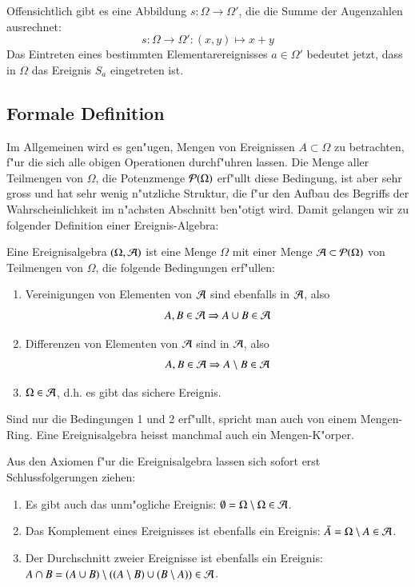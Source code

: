 Offensichtlich gibt es eine Abbildung $s\colon \Omega\to\Omega'$, die 
die Summe der Augenzahlen ausrechnet:
\[
s\colon\Omega\to\Omega':(x,y)\mapsto x+y
\]
Das Eintreten eines bestimmten Elementarereignisses $a \in\Omega'$
bedeutet jetzt, dass in $\Omega$ das Ereignis $S_a$ eingetreten
ist. 

\subsection{Formale Definition}
Im Allgemeinen wird es gen"ugen, Mengen von Ereignissen
$A\subset\Omega$ zu betrachten, f"ur die sich alle obigen
Operationen durchf"uhren lassen. Die Menge aller Teilmengen von
$\Omega$, die Potenzmenge ${\cal P}(\Omega)$ erf"ullt diese Bedingung,
ist aber sehr gross und hat sehr wenig n"utzliche Struktur, die
f"ur den Aufbau des Begriffs der Wahrscheinlichkeit im n"achsten
Abschnitt ben"otigt wird.  Damit gelangen wir zu folgender Definition
einer Ereignis-Algebra:

\begin{definition}
\label{def-ereignisalgebra}
Eine Ereignisalgebra $(\Omega,{\cal A})$ ist
eine Menge $\Omega$ mit einer Menge ${\cal A }\subset{\cal P}(\Omega)$
von Teilmengen von $\Omega$, die folgende Bedingungen erf"ullen:
\begin{enumerate}
\item Vereinigungen von Elementen von ${\cal A}$ sind ebenfalls in ${\cal A}$,
also
\[
A,B\in {\cal A}\Rightarrow A\cup B\in{\cal A}
\]
\item Differenzen von Elementen von ${\cal A}$ sind in ${\cal A}$, also
\[
A,B\in {\cal A}\Rightarrow A\setminus B\in{\cal A}
\]
\item $\Omega\in{\cal A}$, d.h. es gibt das sichere Ereignis.
\end{enumerate}
\end{definition}

Sind nur die Bedingungen 1 und 2 erf"ullt, spricht man auch von einem
Mengen-Ring. Eine Ereignisalgebra heisst manchmal auch ein Mengen-K"orper.

Aus den Axiomen f"ur die Ereignisalgebra lassen sich sofort erst
Schlussfolgerungen ziehen:
\begin{enumerate}
\item Es gibt auch das unm"ogliche Ereignis: $\emptyset = \Omega\setminus\Omega\in{\cal A}$.
\item Das Komplement eines Ereignisses ist ebenfalls ein Ereignis: $\bar A=\Omega\setminus A\in{\cal A}$.
\item Der Durchschnitt zweier Ereignisse ist ebenfalls ein Ereignis: $A\cap B = 
(A\cup B) \setminus ((A\setminus B) \cup (B\setminus A))\in{\cal A}$.
\end{enumerate}

